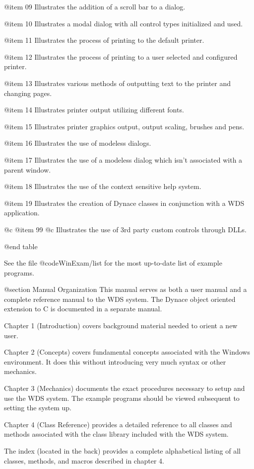@item 09
Illustrates the addition of a scroll bar to a dialog.

@item 10
Illustrates a modal dialog with all control types initialized and used.

@item 11
Illustrates the process of printing to the default printer.

@item 12
Illustrates the process of printing to a user selected and configured printer.

@item 13
Illustrates various methods of outputting text to the printer and
changing pages.

@item 14
Illustrates printer output utilizing different fonts.

@item 15
Illustrates printer graphics output, output scaling, brushes and pens.

@item 16
Illustrates the use of modeless dialogs.

@item 17
Illustrates the use of a modeless dialog which isn't associated with a parent
window.

@item 18
Illustrates the use of the context sensitive help system.

@item 19
Illustrates the creation of Dynace classes in conjunction with a WDS
application.

@c @item 99
@c Illustrates the use of 3rd party custom controls through DLLs.

@end table

See the file @code{WinExam/list} for the most up-to-date list
of example programs.


@section Manual Organization
This manual serves as both a user manual and a complete reference manual
to the WDS  system.  The Dynace object oriented extension to C is documented
in a separate manual. 

Chapter 1 (Introduction) covers background material needed to orient
a new user.

Chapter 2 (Concepts) covers fundamental concepts associated with the
Windows environment.  It does this without introducing very much syntax
or other mechanics.

Chapter 3 (Mechanics) documents the exact procedures necessary to setup
and use the WDS system.  The example programs should be viewed subsequent
to setting the system up.

Chapter 4 (Class Reference)  provides a detailed reference to all
classes and methods associated with the class library included
with the WDS system.

The index (located in the back) provides a complete alphabetical listing
of all classes, methods, and macros described in chapter 4.








